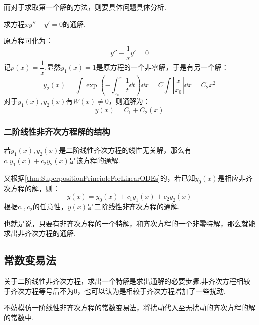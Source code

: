 而对于求取第一个解的方法，则要具体问题具体分析.

\begin{question}
    求方程$xy'' - y' = 0$的通解.
\end{question}

\begin{solution}
    原方程可化为：
    \[y'' - \frac{1}{x}y' = 0\]
    记$p(x) = \dfrac{1}{x}$.显然$y_1(x)= 1$是原方程的一个非零解，于是有另一个解：
    \[y_2(x) = \int \exp(-\int_{x_0}^{x}\frac{1}{t}\dd{t})\dd{x} = C\int \left|\frac{x}{x_0}\right|\dd{x} = C_2 x^2\]
    对于$y_1(x),y_2(x)$有$W(x) \neq 0$，则通解为：
    \[y(x) = C_1 + C_2(x)\]
\end{solution}


\subsubsection{二阶线性非齐次方程解的结构}
若$y_1(x),y_2(x)$是二阶线性齐次方程的线性无关解，那么有$c_1 y_1(x) + c_2 y_2(x)$是该方程的通解.

又根据\cref{thm:SuperpositionPrincipleForLinearODEs}的，若已知$y_0(x)$是相应非齐次方程的解，则：
\[y(x) = y_0(x) + c_1 y_1(x) + c_2 y_2(x)\]
根据$c_1,c_2$的任意性，$y(x)$是二阶线性非齐次方程的通解.

也就是说，只要有非齐次方程的一个特解，和齐次方程的一个非零特解，那么就能求出非齐次方程的通解.


\subsection{常数变易法}

关于二阶线性非齐次方程，求出一个特解是求出通解的必要步骤.非齐次方程相较于齐次方程等号后不为$0$，也可以认为是相较于齐次方程增加了一些扰动.

不妨模仿一阶线性非齐次方程的常数变易法，将扰动代入至无扰动的齐次方程的解的常数中.

